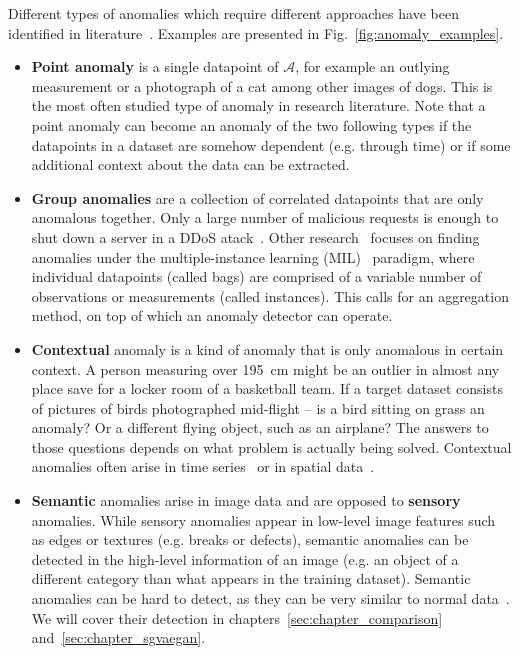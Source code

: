 Different types of anomalies which require different approaches have been identified in literature~\cite{chandola2009anomaly,ruff2020unifying}. Examples are presented in Fig.~\ref{fig:anomaly_examples}.
\begin{itemize}
	\item \textbf{Point anomaly} is a single datapoint of $\mathcal{A}$, for example an outlying measurement or a photograph of a cat among other images of dogs. This is the most often studied type of anomaly in research literature. Note that a point anomaly can become an anomaly of the two following types if the datapoints in a dataset are somehow dependent (e.g. through time) or if some additional context about the data can be extracted.

	\item \textbf{Group anomalies} are a collection of correlated datapoints that are only anomalous together. Only a large number of malicious requests is enough to shut down a server in a DDoS atack~\cite{ahmed2018collective}. Other research~\cite{quellec2016multiple,wan2020weakly} focuses on finding anomalies under the multiple-instance learning (MIL)~\cite{carbonneau2018multiple} paradigm, where individual datapoints (called bags) are comprised of a variable number of observations or measurements (called instances). This calls for an aggregation method, on top of which an anomaly detector can operate.

	\item \textbf{Contextual} anomaly is a kind of anomaly that is only anomalous in certain context. A person measuring over 195~cm might be an outlier in almost any place save for a locker room of a basketball team. If a target dataset consists of pictures of birds photographed mid-flight -- is a bird sitting on grass an anomaly? Or a different flying object, such as an airplane? The answers to those questions depends on what problem is actually being solved. Contextual anomalies often arise in time series~\cite{tsay2000outliers} or in spatial data~\cite{chawla2006slom}.

	\item \textbf{Semantic} anomalies arise in image data and are opposed to \textbf{sensory} anomalies. While sensory anomalies appear in low-level image features such as edges or textures (e.g. breaks or defects), semantic anomalies can be detected in the high-level information of an image (e.g. an object of a different category than what appears in the  training dataset). Semantic anomalies can be hard to detect, as they can be very similar to normal data~\cite{ahmed2020detecting}. We will cover their detection in chapters~\ref{sec:chapter_comparison} and~\ref{sec:chapter_sgvaegan}.
\end{itemize}

